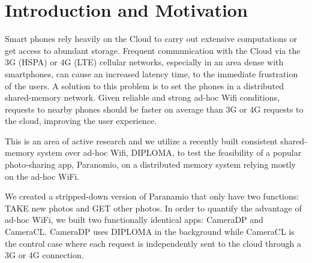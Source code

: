 \chapter{Introduction and Motivation}

Smart phones rely heavily on the Cloud to carry out extensive computations or get access to abundant storage.  Frequent communication with the Cloud via the 3G (HSPA) or 4G (LTE) cellular networks, especially in an area dense with smartphones, can cause an increased latency time, to the immediate frustration of the users. A solution to this problem is to set the phones in a distributed shared-memory network. Given reliable and strong ad-hoc Wifi conditions, requests to nearby phones should be faster on average than 3G or 4G requests to the cloud, improving the user experience. 

This is an area of active research and we utilize a recently built consistent shared-memory system over ad-hoc Wifi, DIPLOMA, to test the feasibility of a popular photo-sharing app, Paranomio, on a distributed memory system relying mostly on the ad-hoc WiFi.

We created a stripped-down version of Paranamio that only have two functions: TAKE new photos and GET other photos. In order to quantify the advantage of ad-hoc WiFi, we built two functionally identical apps: CameraDP and CameraCL. CameraDP uses DIPLOMA in the background while CameraCL is the control case where each request is independently sent to the cloud through a 3G or 4G connection.